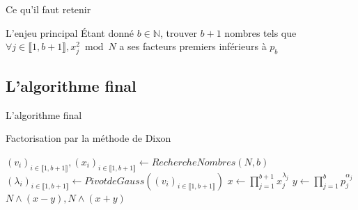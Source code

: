 \documentclass{beamer}
\begin{document}
\begin{frame}{Ce qu'il faut retenir}
    \begingroup
    \begin{block}{L'enjeu principal}
        Étant donné $b\in \mathbb N$, trouver $b+1$ nombres tels que $\forall j\in\llbracket 1, b+1\rrbracket, x_j^2 \bmod N$ a ses facteurs premiers inférieurs à $p_b$
    \end{block}
    \endgroup
\end{frame}

\subsection{L'algorithme final}


\begin{frame}{L'algorithme final}
    \begin{algorithm}[H]
    \caption{Factorisation par la méthode de Dixon}
    \begin{algorithmic}[1]
        \Statex
        \State $(v_i)_{i \in \llbracket 1,b+1 \rrbracket}, (x_i)_{i \in \llbracket 1,b+1 \rrbracket} \gets RechercheNombres(N, b)$
        \State $(\lambda_i)_{i \in \llbracket 1,b+1 \rrbracket} \gets PivotdeGauss((v_i)_{i \in \llbracket 1,b+1 \rrbracket})$
        \State $x \gets \prod_{j=1}^{b+1}x_j^{\lambda_j}$
        \State $y \gets \prod_{j=1}^b p_j^{\alpha_j}$
        \Statex\Statex
        \Return $N \land(x-y), N\land(x+y)$
    \end{algorithmic}
    \end{algorithm}
\end{frame}
\end{document}
